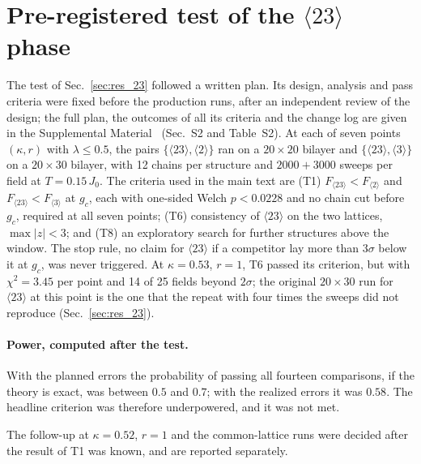 \documentclass[
 aps,prb,
 twocolumn,
 superscriptaddress,
 longbibliography,
 nofootinbib,
 floatfix
]{revtex4-2}
\begin{document}
\section{Pre-registered test of the $\langle23\rangle$ phase}
\label{app:prereg}

The test of Sec.~\ref{sec:res_23} followed a written plan. Its design, analysis and pass criteria were
fixed before the production runs, after an independent review of the design; the full plan, the outcomes of all its
criteria and the change log are given in the Supplemental Material~\cite{supp} (Sec.~S2 and Table~S2). At each of seven
points $(\kappa,r)$ with $\lambda\le0.5$, the pairs $\{\langle23\rangle,\langle2\rangle\}$ ran on a $20\times20$ bilayer
and $\{\langle23\rangle,\langle3\rangle\}$ on a $20\times30$ bilayer, with 12 chains per structure and $2000+3000$ sweeps
per field at $T=0.15\,J_0$. The criteria used in the main text are (T1) $F_{\langle23\rangle}<F_{\langle2\rangle}$ and
$F_{\langle23\rangle}<F_{\langle3\rangle}$ at $g_c$, each with one-sided Welch $p<0.0228$ and no chain cut before $g_c$,
required at all seven points; (T6) consistency of $\langle23\rangle$ on the two lattices, $\max|z|<3$; and (T8) an
exploratory search for further structures above the window. The stop rule, no claim for $\langle23\rangle$ if a
competitor lay more than $3\sigma$ below it at $g_c$, was never triggered. At $\kappa=0.53$, $r=1$, T6 passed its
criterion, but with $\chi^2=3.45$ per point and 14 of 25 fields beyond $2\sigma$; the original $20\times30$ run for
$\langle23\rangle$ at this point is the one that the repeat with four times the sweeps did not reproduce
(Sec.~\ref{sec:res_23}).

\paragraph*{Power, computed after the test.} With the planned errors the probability of passing all fourteen
comparisons, if the theory is exact, was between $0.5$ and $0.7$; with the realized errors it was $0.58$. The headline
criterion was therefore underpowered, and it was not met.

The follow-up at $\kappa=0.52$, $r=1$ and the common-lattice runs were decided after the result of T1 was known, and
are reported separately.

\clearpage

\end{document}
